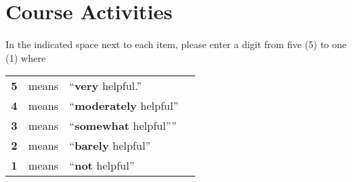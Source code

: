\documentclass[handout]{mcs}
\begin{document}
\newpage
\section*{Course Activities}

In the indicated space next to each item, please enter a digit from five
(5) to one (1) where

\begin{center}
\begin{tabular}{rcll}
\hline
\textbf{5} & means &  ``\textbf{very} helpful.''\\
\textbf{4} & means &  ``\textbf{moderately} helpful''\\
\textbf{3} & means &  ``\textbf{somewhat}  helpful''''\\
\textbf{2} & means &  ``\textbf{barely}  helpful''\\
\textbf{1} & means &  ``\textbf{not}  helpful''\\
\hline
\end{tabular}
\end{center}
\end{document}
